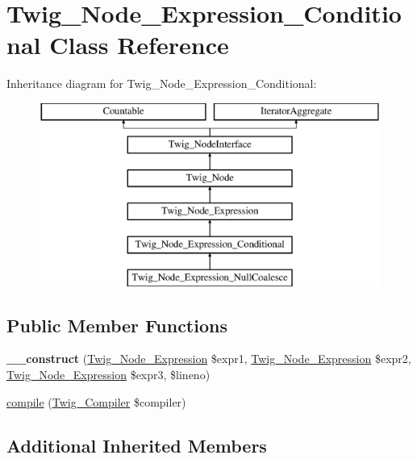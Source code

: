 \hypertarget{classTwig__Node__Expression__Conditional}{}\section{Twig\+\_\+\+Node\+\_\+\+Expression\+\_\+\+Conditional Class Reference}
\label{classTwig__Node__Expression__Conditional}
Inheritance diagram for Twig\+\_\+\+Node\+\_\+\+Expression\+\_\+\+Conditional\+:\begin{figure}[H]
\begin{center}
\leavevmode
\includegraphics[height=6.000000cm]{classTwig__Node__Expression__Conditional}
\end{center}
\end{figure}
\subsection*{Public Member Functions}
\begin{DoxyCompactItemize}
\item 
{\bfseries \+\_\+\+\_\+construct} (\hyperlink{classTwig__Node__Expression}{Twig\+\_\+\+Node\+\_\+\+Expression} \$expr1, \hyperlink{classTwig__Node__Expression}{Twig\+\_\+\+Node\+\_\+\+Expression} \$expr2, \hyperlink{classTwig__Node__Expression}{Twig\+\_\+\+Node\+\_\+\+Expression} \$expr3, \$lineno)\hypertarget{classTwig__Node__Expression__Conditional_a862d13c45ac9cad06b752c71ffada0b8}{}\label{classTwig__Node__Expression__Conditional_a862d13c45ac9cad06b752c71ffada0b8}

\item 
\hyperlink{classTwig__Node__Expression__Conditional_ac5ebdaf7458e6d0376b7de8b3a04720a}{compile} (\hyperlink{classTwig__Compiler}{Twig\+\_\+\+Compiler} \$compiler)
\end{DoxyCompactItemize}
\subsection*{Additional Inherited Members}


